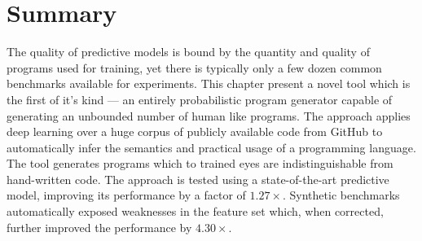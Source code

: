 \section{Summary}%
\label{sec:clgen-conclusion}

The quality of predictive models is bound by the quantity and quality of programs used for training, yet there is typically only a few dozen common benchmarks available for experiments. This chapter present a novel tool which is the first of it's kind --- an entirely probabilistic program generator capable of generating an unbounded number of human like programs. The approach applies deep learning over a huge corpus of publicly available code from GitHub to automatically infer the semantics and practical usage of a programming language. The tool generates programs which to trained eyes are indistinguishable from hand-written code. The approach is tested using a state-of-the-art predictive model, improving its performance by a factor of $1.27\times$. Synthetic benchmarks automatically exposed weaknesses in the feature set which, when corrected, further improved the performance by $4.30\times$.
